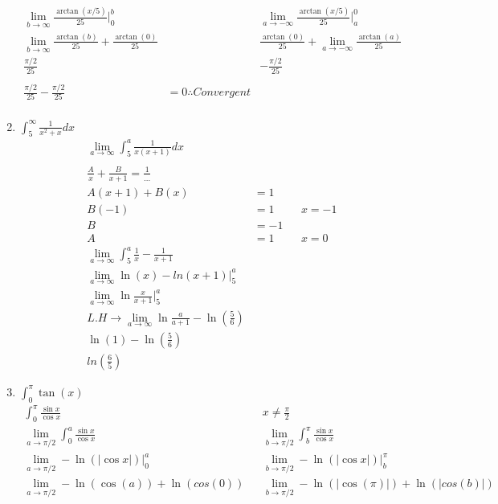 \documentclass[11pt]{article}
\newcommand{\bv}[2]{\big\vert_{#1}^{#2}}
\begin{document}
\begin{enumerate}
\begin{align*}
            \lim_{b\to\infty} \frac{\arctan(x/5)}{25} \bv{0}{b} && \lim_{a\to-\infty} \frac{\arctan(x/5)}{25} \bv{a}{0} \\
            \lim_{b\to\infty} \frac{\arctan(b)}{25} + \frac{\arctan(0)}{25} && \frac{\arctan(0)}{25} + \lim_{a\to-\infty} \frac{\arctan(a)}{25} \\
            \frac{\pi/2}{25} && -\frac{\pi/2}{25} \\
            \\
            \frac{\pi/2}{25} -\frac{\pi/2}{25} &= 0 \therefore Convergent\\
        \end{align*}
        \item $\int_{5}^{\infty}\frac{1}{x^2 + x}dx $
        \begin{align*}
            \label{q2:3}
            \lim_{a\to\infty}\int_{5}^{a} \frac{1}{x(x+1)}dx \\
            \\
            \frac{A}{x} + \frac{B}{x+1} = \frac{1}{...}\\
            A(x+1) + B(x) &= 1 \\
            B(-1) &= 1 && x = -1 \\
            B &= -1 \\
            A &= 1 && x = 0 \\
            \lim_{a\to\infty} \int_{5}^{a} \frac{1}{x} - \frac{1}{x+1} \\
            \lim_{a\to\infty}\ln(x) - ln(x+1)\bv{5}{a} \\
            \lim_{a\to \infty}\ln\frac{x}{x+1}\bv{5}{a} \\
            L.H \to \lim_{a\to \infty}\ln\frac{a}{a+1} - \ln(\frac{5}{6}) \\
            \ln(1) - \ln(\frac{5}{6}) \\
            ln(\frac{6}{5})
        \end{align*}
        \item $ \int_{0}^{\pi}\tan(x)$
        \begin{align*}
            \label{q2:4}
            \int_{0}^{\pi} \frac{\sin x}{\cos x} && x \neq \frac{\pi}{2}\\
            \lim_{a\to \pi/2}\int_{0}^{a} \frac{\sin x}{\cos x} && \lim_{b\to \pi/2}\int_{b}^{\pi} \frac{\sin x}{\cos x}\\
           \lim_{a\to \pi/2}-\ln(|\cos x|) \bv{0}{a} &&\lim_{b\to \pi/2}-\ln(|\cos x|) \bv{b}{\pi} \\
            \lim_{a\to \pi/2} -\ln(\cos(a)) + \ln(cos(0)) && \lim_{b\to \pi/2} -\ln(|\cos(\pi)|) + \ln(|cos(b)|)\\

\end{align*}
\end{enumerate}
\end{document}
